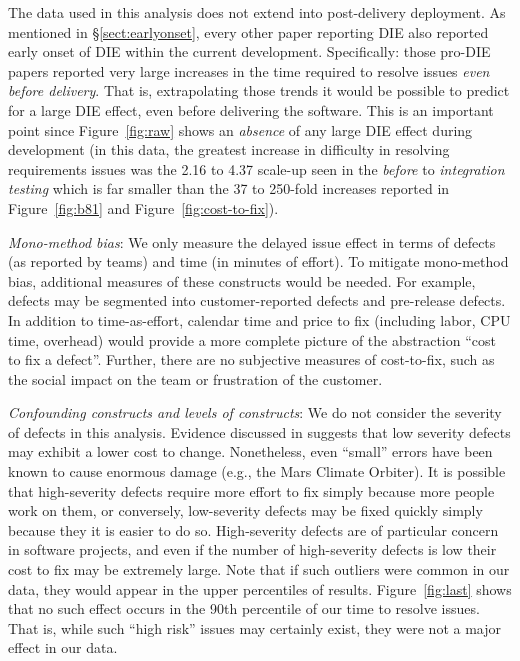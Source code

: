 \documentclass[smallcondensed]{svjour3}
\newcommand{\tion}[1]{\S\ref{sect:#1}}
\newcommand{\fig}[1]{Figure~\ref{fig:#1}}
\begin{document}
The data used in this analysis does not extend into post-delivery deployment. As mentioned in \tion{earlyonset}, every other
paper reporting DIE also reported  early onset of DIE
within the current development. Specifically: those pro-DIE papers reported very large
increases in the time required to resolve issues {\em even before delivery}. That is, extrapolating those
trends it would be possible to predict for a large DIE effect, even before delivering the software.
This is an important point since  Figure~\ref{fig:raw} shows an {\em absence}
of any  large DIE effect during development
(in this data, the greatest increase in difficulty in resolving requirements issues was the 2.16 to 4.37
scale-up seen in the {\em before} to {\em integration testing} 
which is far smaller than the 37 to 250-fold increases reported in \fig{b81} and \fig{cost-to-fix}).  



\textit{Mono-method bias}: We only measure the delayed issue effect in terms of defects (as reported by teams) and time (in minutes of effort). To mitigate mono-method bias, additional measures of these constructs would be needed. For example, defects may be segmented into customer-reported defects and pre-release defects. In addition to time-as-effort, calendar time and price to fix (including labor, CPU time, overhead) would provide a more complete picture of the abstraction ``cost to fix a defect''. Further, there are no subjective measures of cost-to-fix, such as the social impact on the team or frustration of the customer.

\textit{Confounding constructs and levels of constructs}: We do not consider the severity of defects in this analysis. Evidence discussed in \cite{Shull02} suggests that low severity defects may exhibit a lower cost to change. Nonetheless, even ``small'' errors have been known to cause enormous damage (e.g., the Mars Climate Orbiter). It is possible that high-severity defects require more effort to fix simply because more people work on them, or conversely, low-severity defects may be fixed quickly simply because they it is easier to do so. High-severity defects are of particular concern in software projects, and even if the number of high-severity defects is low their cost to fix may be extremely large. Note that if such outliers were common in our data, they would appear in the upper percentiles of results. \fig{last} shows that no such effect occurs in the 90th percentile of our time to resolve
issues.    That is, while such ``high risk'' issues may certainly exist, they were not a major effect in our data.
\end{document}
